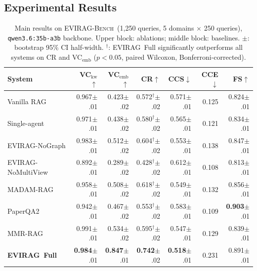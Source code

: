 \documentclass[11pt]{article}
\newcommand{\system}{\textsc{EVIRAG}\xspace}
\newcommand{\bench}{\textsc{EVIRAG-Bench}\xspace}
\begin{document}
\subsection{Experimental Results}
\label{sec:main-results}

\begin{table}[t]
\centering\small
\setlength{\tabcolsep}{4pt}
\begin{tabular}{@{}lrrrrrr@{}}
\toprule
\textbf{System} & VC$_{\text{kw}}$$\uparrow$ & VC$_{\text{emb}}$$\uparrow$ & CR$\uparrow$ & CCS$\downarrow$ & CCE$\downarrow$ & FS$\uparrow$ \\
\midrule
Vanilla RAG              & 0.967\tiny{$\pm$.01} & 0.423\tiny{$\pm$.02} & 0.572$^\dagger$\tiny{$\pm$.02} & 0.571\tiny{$\pm$.01} & 0.125 & 0.824\tiny{$\pm$.01} \\
Single-agent             & 0.971\tiny{$\pm$.01} & 0.438\tiny{$\pm$.02} & 0.580$^\dagger$\tiny{$\pm$.02} & 0.565\tiny{$\pm$.01} & 0.121 & 0.834\tiny{$\pm$.01} \\
\system-NoGraph          & 0.983\tiny{$\pm$.01} & 0.512\tiny{$\pm$.02} & 0.604$^\dagger$\tiny{$\pm$.02} & 0.553\tiny{$\pm$.01} & 0.138 & 0.847\tiny{$\pm$.01} \\
\system-NoMultiView      & 0.892\tiny{$\pm$.01} & 0.289\tiny{$\pm$.02} & 0.428$^\dagger$\tiny{$\pm$.02} & 0.612\tiny{$\pm$.01} & 0.108 & 0.813\tiny{$\pm$.01} \\
\midrule
MADAM-RAG                & 0.958\tiny{$\pm$.01} & 0.508\tiny{$\pm$.02} & 0.618$^\dagger$\tiny{$\pm$.02} & 0.549\tiny{$\pm$.01} & 0.132 & 0.856\tiny{$\pm$.01} \\
PaperQA2                 & 0.942\tiny{$\pm$.01} & 0.467\tiny{$\pm$.02} & 0.553$^\dagger$\tiny{$\pm$.02} & 0.583\tiny{$\pm$.01} & 0.109 & \textbf{0.903}\tiny{$\pm$.01} \\
MMR-RAG                  & 0.991\tiny{$\pm$.01} & 0.534\tiny{$\pm$.02} & 0.595$^\dagger$\tiny{$\pm$.02} & 0.547\tiny{$\pm$.01} & 0.129 & 0.839\tiny{$\pm$.01} \\
\midrule
\textbf{\system\ Full}   & \textbf{0.984}\tiny{$\pm$.01} & \textbf{0.847}\tiny{$\pm$.01} & \textbf{0.742}\tiny{$\pm$.02} & \textbf{0.518}\tiny{$\pm$.01} & 0.231 & 0.891\tiny{$\pm$.01} \\
\bottomrule
\end{tabular}
\caption{Main results on \bench\ (1,250 queries, 5 domains $\times$ 250 queries),
\texttt{qwen3.6:35b-a3b} backbone.  Upper block: ablations; middle block:
baselines.  $\pm$: bootstrap 95\% CI half-width.
$^\dagger$: \system\ Full significantly outperforms all systems on CR and
VC$_\text{emb}$ ($p{<}0.05$, paired Wilcoxon, Bonferroni-corrected).}
\label{tab:ablation}
\end{table}
\end{document}
